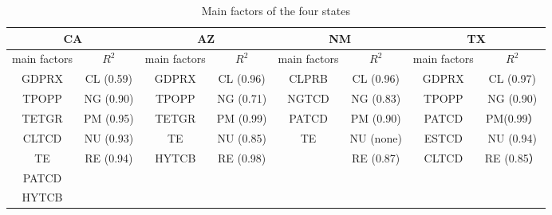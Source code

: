 \begin{table}[H]
\centering
\label{table: mainfactors}
\caption{Main factors of the four states}
    \begin{threeparttable}
\begin{tabular}{cccccccc}
\toprule
\multicolumn{2}{c}{CA}   & \multicolumn{2}{c}{AZ}   & \multicolumn{2}{c}{NM}   & \multicolumn{2}{c}{TX}   \\
\midrule

main factors & $R^2$     & main factors & $R^2$     & main factors & $R^2$     & main factors & $R^2$     \\
GDPRX        & CL (0.59) & GDPRX        & CL (0.96) & CLPRB        & CL (0.96) & GDPRX        & CL (0.97) \\
TPOPP        & NG (0.90) & TPOPP        & NG (0.71) & NGTCD        & NG (0.83) & TPOPP        & NG (0.90) \\
TETGR        & PM (0.95) & TETGR        & PM (0.99) & PATCD        & PM (0.90) & PATCD        & PM(0.99）  \\
CLTCD        & NU (0.93) & TE           & NU (0.85) & TE           & NU (none) & ESTCD        & NU (0.94) \\
TE           & RE (0.94) & HYTCB        & RE (0.98) &              & RE (0.87) & CLTCD        & RE (0.85） \\
PATCD        &           &              &           &              &           &              &           \\
HYTCB        &           &              &           &              &           &              &          \\
         \bottomrule
\end{tabular}
    \end{threeparttable}
    
\end{table}
